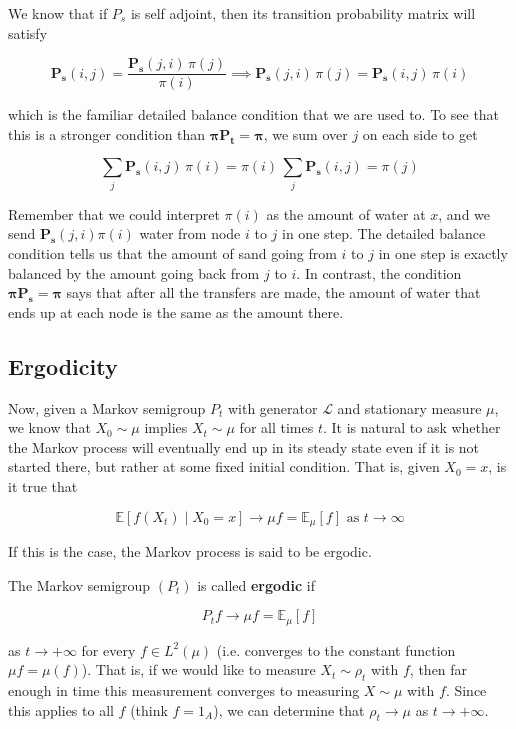 \documentclass{article}
\begin{document}
    \begin{example}
      We know that if $P_s$ is self adjoint, then its transition probability matrix will satisfy 

        \[\mathbf{P_s}(i, j) = \frac{\mathbf{P_s}(j, i) \, \pi(j)}{\pi(i)} \implies \mathbf{P_s}(j, i) \, \pi(j) = \mathbf{P_s}(i, j) \, \pi(i)\]

      which is the familiar detailed balance condition that we are used to. To see that this is a stronger condition than $\boldsymbol{\pi} \mathbf{P_t} = \boldsymbol{\pi}$, we sum over $j$ on each side to get 

        \[\sum_j \mathbf{P_s}(i, j) \, \pi(i) = \pi(i) \, \sum_j \mathbf{P_s}(i, j) = \pi(j)\]

      Remember that we could interpret $\pi(i)$ as the amount of water at $x$, and we send $\mathbf{P_s}(j, i) \pi(i)$ water from node $i$ to $j$ in one step. The detailed balance condition tells us that the amount of sand going from $i$ to $j$ in one step is exactly balanced by the amount going back from $j$ to $i$. In contrast, the condition $\boldsymbol{\pi} \mathbf{P_s} = \boldsymbol{\pi}$ says that after all the transfers are made, the amount of water that ends up at each node is the same as the amount there. 
    \end{example}

  \subsection{Ergodicity}

    Now, given a Markov semigroup $P_t$ with generator $\mathscr{L}$ and stationary measure $\mu$, we know that $X_0 \sim \mu$ implies $X_t \sim \mu$ for all times $t$. It is natural to ask whether the Markov process will eventually end up in its steady state even if it is not started there, but rather at some fixed initial condition. That is, given $X_0 = x$, is it true that 

      \[\mathbb{E}[f(X_t) \mid X_0 = x] \rightarrow \mu f = \mathbb{E}_\mu [f] \text{ as } t \rightarrow \infty\]

    If this is the case, the Markov process is said to be ergodic. 

    \begin{definition}[Ergodicity]
      The Markov semigroup $(P_t)$ is called \textbf{ergodic} if 

        \[P_t f \rightarrow \mu f = \mathbb{E}_\mu [f]\]

      as $t \rightarrow +\infty$ for every $f \in L^2 (\mu)$ (i.e. converges to the constant function $\mu f = \mu(f)$). That is, if we would like to measure $X_t \sim \rho_t$ with $f$, then far enough in time this measurement converges to measuring $X \sim \mu$ with $f$. Since this applies to all $f$ (think $f = 1_A$), we can determine that $\rho_t \rightarrow \mu$ as $t \rightarrow +\infty$. 
    \end{definition}
\end{document}
